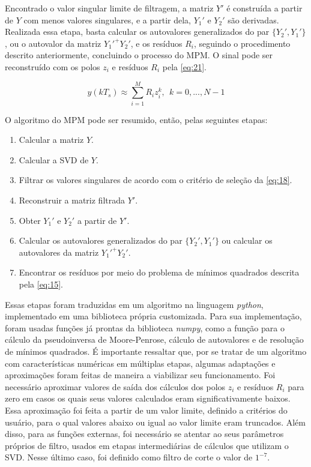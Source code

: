 \documentclass[12pt]{article}
\begin{document}
Encontrado o valor singular limite de filtragem, a matriz $Y'$ é construída a partir de $Y$ com menos valores singulares, e a partir dela, $Y_1'$ e $Y_2'$ são derivadas. Realizada essa etapa, 
basta calcular os autovalores generalizados do par $\{Y_2', Y_1'\}$, ou o autovalor da matriz $Y_1'^+Y_2'$, e os resíduos $R_i$, seguindo o procedimento descrito anteriormente,
concluindo o processo do MPM. O sinal pode ser reconstruído com os polos $z_i$ e resíduos $R_i$ pela \autoref{eq:21}.

\begin{equation} \label{eq:21}
    y(kT_s) \approx \sum_{i = 1}^{M}R_i z_i^{k}, \ \ k = 0,...,N-1
\end{equation}

O algoritmo do MPM pode ser resumido, então, pelas seguintes etapas:

\begin{enumerate} \label{en:1}
    \item Calcular a matriz $Y$.
    \item Calcular a SVD de $Y$.
    \item Filtrar os valores singulares de acordo com o critério de seleção da \autoref{eq:18}.
    \item Reconstruir a matriz filtrada $Y'$.
    \item Obter $Y_1'$ e $Y_2'$ a partir de $Y'$.
    \item Calcular os autovalores generalizados do par $\{Y_2', Y_1'\}$ ou calcular os autovalores da matriz $Y_1'^+Y_2'$.
    \item Encontrar os resíduos por meio do problema de mínimos quadrados descrita pela \autoref{eq:15}.
\end{enumerate}

Essas etapas foram traduzidas em um algoritmo na linguagem \textit{python}, implementado em uma biblioteca própria customizada. Para sua implementação, 
foram usadas funções já prontas da biblioteca \textit{numpy}, como a função para o cálculo da pseudoinversa de Moore-Penrose, cálculo de autovalores e de resolução de 
mínimos quadrados. É importante ressaltar que, por se tratar de um algoritmo com características numéricas em múltiplas etapas, algumas adaptações e 
aproximações foram feitas de maneira a viabilizar seu funcionamento. Foi necessário aproximar valores de saída dos cálculos dos polos $z_i$ e resíduos 
$R_i$ para zero em casos os quais seus valores calculados eram significativamente baixos. Essa aproximação foi feita a partir de um valor limite, definido 
a critérios do usuário, para o qual valores abaixo ou igual ao valor limite eram truncados. Além disso, para as funções externas, foi necessário se atentar 
ao seus parâmetros próprios de filtro, usados em etapas intermediárias de cálculos que utilizam o SVD. Nesse último caso, foi definido como filtro de corte o 
valor de $1^{-7}$.
\end{document}
